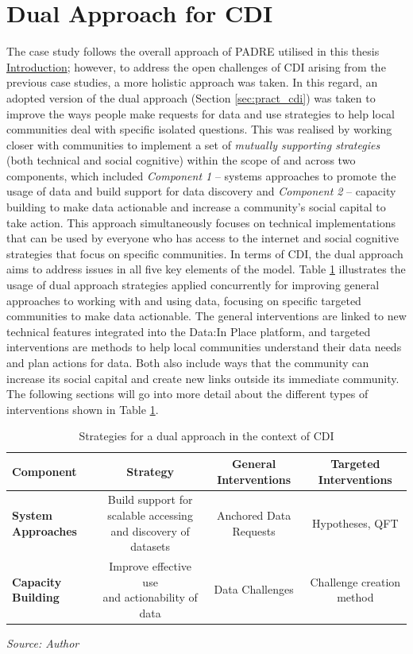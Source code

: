 \section{Dual Approach for CDI}
\label{sec:dual_cdi}
The case study follows the overall approach of PADRE utilised in this thesis \hyperlink{introduction}{Introduction}; however, to address the open challenges of CDI arising from the previous case studies, a more holistic approach was taken. In this regard, an adopted version of the dual approach (Section \ref{sec:pract_cdi}) was taken to improve the ways people make requests for data and use strategies to help local communities deal with specific isolated questions. This was realised by working closer with communities to implement a set of \textit{mutually supporting strategies} (both technical and social cognitive) within the scope of and across two components, which included \textit{Component 1} -- systems approaches to promote the usage of data and build support for data discovery and \textit{Component 2} -- capacity building to make data actionable and increase a community's social capital to take action. This approach simultaneously focuses on technical implementations that can be used by everyone who has access to the internet and social cognitive strategies that focus on specific communities. In terms of CDI, the dual approach aims to address issues in all five key elements of the model. Table \ref{tab:dual_approach} illustrates the usage of dual approach strategies applied concurrently for improving general approaches to working with and using data, focusing on specific targeted communities to make data actionable. The general interventions are linked to new technical features integrated into the Data:In Place platform, and targeted interventions are methods to help local communities understand their data needs and plan actions for data. Both also include ways that the community can increase its social capital and create new links outside its immediate community. The following sections will go into more detail about the different types of interventions shown in Table \ref{tab:dual_approach}.

\begin{table}[!htb]
\scriptsize
\centering
\begin{tabular}{|l|c|c|c|}
\hline
\textbf{Component} & \textbf{Strategy} & \textbf{General Interventions} & \textbf{Targeted Interventions} \\ [0.5ex]
\hline
\rowcolor[gray]{.9}\textbf{System Approaches}	& \makecell{Build support for scalable accessing \\ and discovery of datasets} & Anchored Data Requests & Hypotheses, QFT \\
\hline
\textbf{Capacity Building} & \makecell{Improve effective use \\ and actionability of data} & Data Challenges & Challenge creation method \\ [0.5ex]
\hline
\end{tabular}

\smallskip\centering
    \footnotesize\emph{Source: Author}
\caption[Dual Approach for CDI]{Strategies for a dual approach in the context of CDI}
\label{tab:dual_approach}
\end{table}

